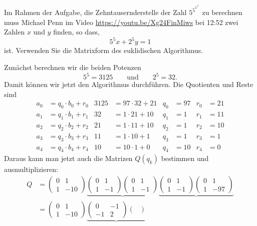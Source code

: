 Im Rahmen der Aufgabe, die Zehntausernderstelle der Zahl $5^{5^{5^{5^5}}}$
zu berechnen muss Michael Penn im Video 
\url{https://youtu.be/Xg24FinMiws} bei 12:52 zwei Zahlen $x$ und $y$ finden,
so dass,
\[
5^5x
+
2^5y
=
1
\]
ist.
Verwenden Sie die Matrixform des euklidischen Algorithmus.

\begin{loesung}
Zunächst berechnen wir die beiden Potenzen
\[
5^5 = 3125
\qquad\text{und}\qquad
2^5 = 32.
\]
Damit können wir jetzt den Algorithmus durchführen.
Die Quotienten und Reste sind
\begin{align*}
a_0&=q_0\cdot b_0 + r_0&
3125 &= 97 \cdot 32 + 21& q_0&=97 & r_0&= 21\\
a_1&=q_1\cdot b_1 + r_1&
32 &= 1\cdot 21 + 10    & q_1&= 1 & r_1&= 11\\
a_2&=q_2\cdot b_2 + r_2&
21 &= 1\cdot 11 + 10    & q_2&= 1 & r_2&= 10\\
a_3&=q_3\cdot b_3 + r_3&
11 &= 1\cdot 10 +  1    & q_3&= 1 & r_3&=  1\\
a_4&=q_4\cdot b_4 + r_4&
10 &= 10\cdot 1 +  0    & q_4&=10 & r_4&=  0
\end{align*}
Daraus kann man jetzt auch die Matrizen $Q(q_k)$ bestimmen und
ausmultiplizieren:
\begin{align*}
Q
&=
\begin{pmatrix}
0&1\\1&-10
\end{pmatrix}
\underbrace{
\begin{pmatrix}
0&1\\1&-1
\end{pmatrix}
\begin{pmatrix}
0&1\\1&-1
\end{pmatrix}
}_{}
\underbrace{
\begin{pmatrix}
0&1\\1&-1
\end{pmatrix}
\begin{pmatrix}
0&1\\1&-97
\end{pmatrix}
}_{}
\\
&=
\begin{pmatrix}
0&1\\1&-10
\end{pmatrix}
\underbrace{
\begin{pmatrix}
0&-1\\-1&2
\end{pmatrix}
\begin{pmatrix}

\end{pmatrix}}
\end{align*}
\end{loesung}
